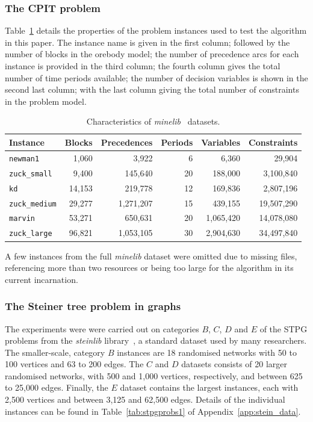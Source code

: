 \documentclass[journal]{IEEEtran}
\begin{document}
\subsubsection*{\textbf{The CPIT problem}}
Table~\ref{tab:datasets} details the properties of the problem instances used to test the algorithm in this paper. The instance name is given in the first column; followed by the number of blocks in the orebody model; the number of precedence arcs for each instance is provided in the third column; the fourth column gives the total number of time periods available; the number of decision variables is shown in the second last column; with the last column giving the total number of constraints in the problem model.\par
%
\begin{table}[h!]
\centering
\caption{Characteristics of \emph{minelib}~\cite{minelib} datasets.}\label{tab:datasets}
\begin{adjustbox}{width=0.48\textwidth}
\begin{tabular}{lrrrrr} \toprule
Instance & Blocks & Precedences & Periods & Variables & Constraints\\
\hline
\texttt{newman1} & 1,060 & 3,922 & 6 & 6,360 & 29,904\\
\texttt{zuck\_small} & 9,400 & 145,640 & 20 & 188,000 & 3,100,840\\
\texttt{kd} & 14,153 & 219,778 & 12 & 169,836 & 2,807,196\\
\texttt{zuck\_medium} & 29,277 & 1,271,207 & 15 & 439,155 & 19,507,290\\
\texttt{marvin} & 53,271 & 650,631 & 20 & 1,065,420 & 14,078,080\\
\texttt{zuck\_large} & 96,821 & 1,053,105 & 30 & 2,904,630 & 34,497,840\\
\bottomrule
\end{tabular}
\end{adjustbox}
\end{table}
%
A few instances from the full \emph{minelib} dataset were omitted due to missing files, referencing more than two resources or being too large for the algorithm in its current incarnation.

\subsubsection*{\textbf{The Steiner tree problem in graphs}}

The experiments were were carried out on categories $B$, $C$, $D$ and $E$ of the STPG problems from the \textit{steinlib} library~\cite{steinlib}, a standard dataset used by many researchers. The smaller-scale, category $B$ instances are 18 randomised networks with 50 to 100 vertices and 63 to 200 edges. The $C$ and $D$ datasets consists of 20 larger randomised networks, with 500 and 1,000 vertices, respectively, and between 625 to 25,000 edges. Finally, the $E$ dataset contains the largest instances, each with 2,500 vertices and between 3,125 and 62,500 edges. Details of the individual instances can be found in Table~\ref{tab:stpgprobs1} of Appendix~\ref{app:stein_data}. 
\end{document}
